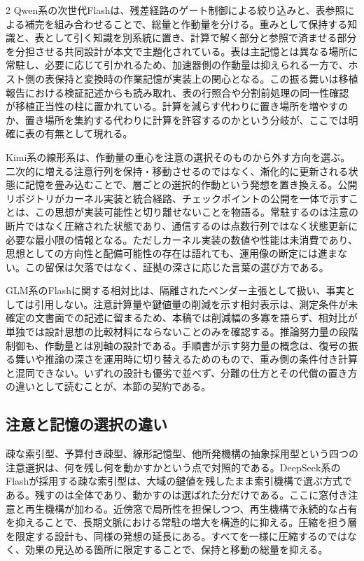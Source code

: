 \documentclass[lualatex,a4paper,10pt]{jlreq}
\begin{document}
\begin{multicols}{2}
Qwen系の次世代Flashは、残差経路のゲート制御による絞り込みと、表参照による補完を組み合わせることで、総量と作動量を分ける。重みとして保持する知識と、表として引く知識を別系統に置き、計算で解く部分と参照で済ませる部分を分担させる共同設計が本文で主題化されている\autocite{qwen38next}\autocite{qwenreadme}\autocite{qwenblog}。表は主記憶とは異なる場所に常駐し、必要に応じて引かれるため、加速器側の作動量は抑えられる一方で、ホスト側の表保持と変換時の作業記憶が実装上の関心となる。この振る舞いは移植報告における検証記述からも読み取れ、表の行照合や分割前処理の同一性確認が移植正当性の柱に置かれている\autocite{qwenpr}\autocite{qwen38repo}。計算を減らす代わりに置き場所を増やすのか、置き場所を集約する代わりに計算を許容するのかという分岐が、ここでは明確に表の有無として現れる。

Kimi系の線形系は、作動量の重心を注意の選択そのものから外す方向を選ぶ。二次的に増える注意行列を保持・移動させるのではなく、漸化的に更新される状態に記憶を畳み込むことで、層ごとの選択的作動という発想を置き換える。公開リポジトリがカーネル実装と統合経路、チェックポイントの公開を一体で示すことは、この思想が実装可能性と切り離せないことを物語る\autocite{kimigithub}\autocite{kda}。常駐するのは注意の断片ではなく圧縮された状態であり、通信するのは点数行列ではなく状態更新に必要な最小限の情報となる。ただしカーネル実装の数値や性能は未消費であり、思想としての方向性と配備可能性の存在は語れても、運用像の断定には進まない。この留保は欠落ではなく、証拠の深さに応じた言葉の選び方である。

GLM系のFlashに関する相対比は、隔離されたベンダー主張として扱い、事実としては引用しない。注意計算量や鍵値量の削減を示す相対表示は、測定条件が未確定の文書面での記述に留まるため\autocite{zaidocs}\autocite{glm5github}、本稿では削減幅の多寡を語らず、相対比が単独では設計思想の比較材料にならないことのみを確認する。推論努力量の段階制御も、作動量とは別軸の設計である。手順書が示す努力量の概念は、復号の振る舞いや推論の深さを運用時に切り替えるためのもので、重み側の条件付き計算と混同できない\autocite{vllmrecipe}\autocite{dspark}。いずれの設計も優劣で並べず、分離の仕方とその代償の置き方の違いとして読むことが、本節の契約である。

\subsection{注意と記憶の選択の違い}
疎な索引型、予算付き疎型、線形記憶型、他所発機構の抽象採用型という四つの注意選択は、何を残し何を動かすかという点で対照的である。DeepSeek系のFlashが採用する疎な索引型は、大域の鍵値を残したまま索引機構で選ぶ方式である\autocite{v41report}\autocite{vllmrecipe}\autocite{vllmv41}。残すのは全体であり、動かすのは選ばれた分だけである。ここに窓付き注意と再生機構が加わる。近傍窓で局所性を担保しつつ、再生機構で永続的な占有を抑えることで、長期文脈における常駐の増大を構造的に抑える。圧縮を担う層を限定する設計も、同様の発想の延長にある。すべてを一様に圧縮するのではなく、効果の見込める箇所に限定することで、保持と移動の総量を抑える。


\end{multicols}
\end{document}
